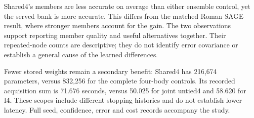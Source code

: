 Shared4's members are less accurate on average than either ensemble control, yet the served bank is more accurate. This differs from the matched Roman SAGE result, where stronger members account for the gain. The two observations support reporting member quality and useful alternatives together. Their repeated-node counts are descriptive; they do not identify error covariance or establish a general cause of the learned differences.

Fewer stored weights remain a secondary benefit: Shared4 has 216,674 parameters, versus 832,256 for the complete four-body controls. Its recorded acquisition sum is 71.676 seconds, versus 50.025 for joint untied4 and 58.620 for I4. These scopes include different stopping histories and do not establish lower latency. Full seed, confidence, error and cost records accompany the study.

